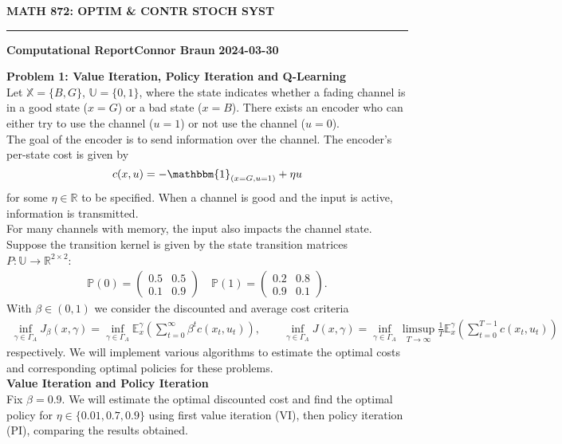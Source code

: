 \documentclass[10pt]{article}
\newcommand{\E}{\mathbb{E}}
\newcommand{\bp}[1]{\left({#1}\right)}
\newcommand{\mbb}[1]{\mathbb{#1}}
\newcommand{\1}[1]{\mathbbm{1}_{#1}}
\begin{document}
    \begin{center}
        {\bf\large{MATH 872: OPTIM \& CONTR STOCH SYST}}
        \smallskip
        \hrule
        \smallskip
        {\bf Computational Report}\hfill {\bf Connor Braun} \hfill {\bf 2024-03-30}
    \end{center}
    {\bf Problem 1: Value Iteration, Policy Iteration and Q-Learning}\\[5pt]
    Let $\mbb{X}=\{B,G\}$, $\mbb{U}=\{0,1\}$, where the state indicates whether a fading channel is in a good state
    ($x=G$) or a bad state ($x=B$). There exists an encoder who can either try to use the channel ($u=1$) or not use the channel ($u=0$).\\[5pt]
    The goal of the encoder is to send information over the channel. The encoder's per-state cost is given by
    \[c(x,u)=-\1{(x=G,u=1)}+\eta u\]
    for some $\eta\in\mathbb{R}$ to be specified. When a channel is good and the input is active, information is transmitted.\\[5pt]
    For many channels with memory, the input also impacts the channel state. Suppose the transition kernel is given by the state transition matrices $P:\mbb{U}\rightarrow\mbb{R}^{2\times 2}$:
    \begin{align*}
        \mbb{P}(0)=\begin{pmatrix}
            0.5 & 0.5\\
            0.1 & 0.9
        \end{pmatrix}\quad \mbb{P}(1)=\begin{pmatrix}
            0.2 & 0.8\\
            0.9 & 0.1
        \end{pmatrix}.
    \end{align*}
    With $\beta\in(0,1)$ we consider the discounted and average cost criteria
    \begin{align*}
        \inf_{\gamma\in\Gamma_A}J_\beta(x,\gamma)=\inf_{\gamma\in\Gamma_A}\E^\gamma_x\bp{\sum_{t=0}^\infty\beta^tc(x_t,u_t)},\qquad
        \inf_{\gamma\in\Gamma_A}J(x,\gamma)=\inf_{\gamma\in\Gamma_A}\limsup_{T\rightarrow\infty}\frac{1}{T}\E^\gamma_x\bp{\sum_{t=0}^{T-1}c(x_t,u_t)}
    \end{align*}
    respectively. We will implement various algorithms to estimate the optimal costs and corresponding optimal policies for these problems.\\[5pt]
    {\bf Value Iteration and Policy Iteration}\\[5pt]
    Fix $\beta=0.9$. We will estimate the optimal discounted cost and find the optimal policy for $\eta\in\{0.01,0.7,0.9\}$ using first value iteration (VI), then policy iteration (PI), comparing the results obtained.
\end{document}
